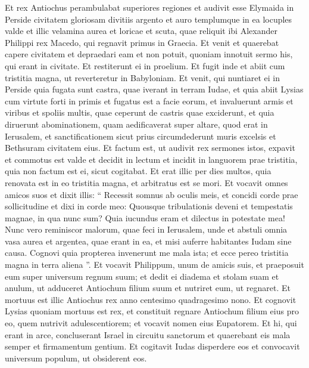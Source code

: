 \begin{biblechapter}
\begin{biblechapter}
\begin{biblechapter}
\begin{biblechapter}
\begin{biblechapter}
\begin{biblechapter}
\verse Et rex Antiochus perambulabat superiores regiones et audivit esse Elymaida in Perside civitatem gloriosam divitiis argento et auro 
\verse templumque in ea locuples valde et illic velamina aurea et loricae et scuta, quae reliquit ibi Alexander Philippi rex Macedo, qui regnavit primus in Graecia. 
 \verse Et venit et quaerebat capere civitatem et depraedari eam et non potuit, quoniam innotuit sermo his, qui erant in civitate. 
\verse Et restiterunt ei in proelium. Et fugit inde et abiit cum tristitia magna, ut reverteretur in Babyloniam. 
\verse Et venit, qui nuntiaret ei in Perside quia fugata sunt castra, quae iverant in terram Iudae, 
\verse et quia abiit Lysias cum virtute forti in primis et fugatus est a facie eorum, et invaluerunt armis et viribus et spoliis multis, quae ceperunt de castris quae exciderunt, 
\verse et quia diruerunt abominationem, quam aedificaverat super altare, quod erat in Ierusalem, et sanctificationem sicut prius circumdederunt muris excelsis et Bethsuram civitatem eius. 
\verse Et factum est, ut audivit rex sermones istos, expavit et commotus est valde et decidit in lectum et incidit in languorem prae tristitia, quia non factum est ei, sicut cogitabat. 
\verse Et erat illic per dies multos, quia renovata est in eo tristitia magna, et arbitratus est se mori. 
\verse Et vocavit omnes amicos suos et dixit illis: “ Recessit somnus ab oculis meis, et concidi corde prae sollicitudine 
\verse et dixi in corde meo: Quousque tribulationis deveni et tempestatis magnae, in qua nunc sum? Quia iucundus eram et dilectus in potestate mea! 
\verse Nunc vero reminiscor malorum, quae feci in Ierusalem, unde et abstuli omnia vasa aurea et argentea, quae erant in ea, et misi auferre habitantes Iudam sine causa. 
\verse Cognovi quia propterea invenerunt me mala ista; et ecce pereo tristitia magna in terra aliena ”. 
\verse Et vocavit Philippum, unum de amicis suis, et praeposuit eum super universum regnum suum; 
\verse et dedit ei diadema et stolam suam et anulum, ut adduceret Antiochum filium suum et nutriret eum, ut regnaret. 
\verse Et mortuus est illic Antiochus rex anno centesimo quadragesimo nono. 
\verse Et cognovit Lysias quoniam mortuus est rex, et constituit regnare Antiochum filium eius pro eo, quem nutrivit adulescentiorem; et vocavit nomen eius Eupatorem.
 \verse Et hi, qui erant in arce, concluserant Israel in circuitu sanctorum et quaerebant eis mala semper et firmamentum gentium. 
\verse Et cogitavit Iudas disperdere eos et convocavit universum populum, ut obsiderent eos. 

\end{biblechapter}
\end{biblechapter}
\end{biblechapter}
\end{biblechapter}
\end{biblechapter}
\end{biblechapter}
